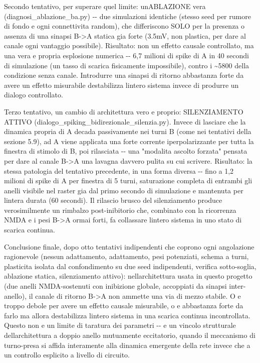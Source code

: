 \documentclass[
  italian,
]{article}
\begin{document}
Secondo tentativo, per superare quel limite: un\textquotesingle ABLAZIONE vera (diagnosi\_\allowbreak{}ablazione\_\allowbreak{}ba.py) -\/- due simulazioni identiche (stesso seed per rumore di fondo e ogni connettivita\textquotesingle{} random), che differiscono SOLO per la presenza o assenza di una sinapsi B-\textgreater A statica gia\textquotesingle{} forte (3.5mV, non plastica, per dare al canale ogni vantaggio possibile). Risultato: non un effetto causale controllato, ma una vera e propria esplosione numerica -\/- 6,7 milioni di spike di A in 40 secondi di simulazione (un tasso di scarica fisicamente impossibile), contro i \textasciitilde5800 della condizione senza canale. Introdurre una sinapsi di ritorno abbastanza forte da avere un effetto misurabile destabilizza l\textquotesingle intero sistema invece di produrre un dialogo controllato.

Terzo tentativo, un cambio di architettura vero e proprio: SILENZIAMENTO ATTIVO (dialogo\_\allowbreak{}spiking\_\allowbreak{}bidirezionale\_\allowbreak{}silenzia.py). Invece di lasciare che la dinamica propria di A decada passivamente nei turni \textquotesingle B\textquotesingle{} (come nei tentativi della sezione 5.9), ad A viene applicata una forte corrente iperpolarizzante per tutta la finestra di stimolo di B, poi rilasciata -\/- una "modalita\textquotesingle{} ascolto forzata" pensata per dare al canale B-\textgreater A una lavagna davvero pulita su cui scrivere. Risultato: la stessa patologia del tentativo precedente, in una forma diversa -\/- fino a 1,2 milioni di spike di A per finestra di 5 turni, saturazione completa di entrambi gli anelli visibile nel raster gia\textquotesingle{} dal primo secondo di simulazione e mantenuta per l\textquotesingle intera durata (60 secondi). Il rilascio brusco del silenziamento produce verosimilmente un rimbalzo post-inibitorio che, combinato con la ricorrenza NMDA e i pesi B-\textgreater A ormai forti, fa collassare l\textquotesingle intero sistema in uno stato di scarica continua.

Conclusione finale, dopo otto tentativi indipendenti che coprono ogni angolazione ragionevole (nessun adattamento, adattamento, pesi potenziati, schema a turni, plasticita\textquotesingle{} isolata dal confondimento su due seed indipendenti, verifica sotto-soglia, ablazione statica, silenziamento attivo): nell\textquotesingle architettura usata in questo progetto (due anelli NMDA-sostenuti con inibizione globale, accoppiati da sinapsi inter-anello), il canale di ritorno B-\textgreater A non ammette una via di mezzo stabile. O e\textquotesingle{} troppo debole per avere un effetto causale misurabile, o e\textquotesingle{} abbastanza forte da farlo ma allora destabilizza l\textquotesingle intero sistema in una scarica continua incontrollata. Questo non e\textquotesingle{} un limite di taratura dei parametri -\/- e\textquotesingle{} un vincolo strutturale dell\textquotesingle architettura a doppio anello mutuamente eccitatorio, quando il meccanismo di turno-presa si affida interamente alla dinamica emergente della rete invece che a un controllo esplicito a livello di circuito.
\end{document}
